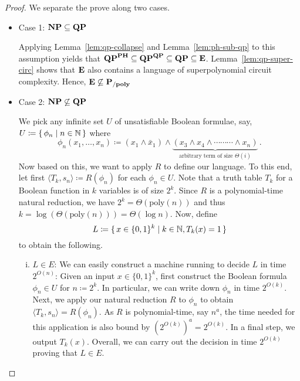 \documentclass[11pt]{article}
\begin{document}
\begin{proof}
  We separate the prove along two cases.
	\begin{itemize}
		\item Case 1: $\mathbf{NP} \subseteq \mathbf{QP}$

      Applying Lemma~\ref{lem:qp-collapse} and Lemma~\ref{lem:ph-sub-qp} to this assumption yields that
      $\mathbf{QP}^{\mathbf{PH}} \subseteq \mathbf{QP}^{\mathbf{QP}} \subseteq
       \mathbf{QP} \subseteq \mathbf{E}$.
      Lemma~\ref{lem:qp-super-circ} shows that $\mathbf{E}$ also contains
      a language of superpolynomial circuit complexity.
      Hence, $\mathbf{E} \not\subseteq \mathbf{P_{/poly}}$\\
		
		\item Case 2: $\mathbf{NP} \not\subseteq \mathbf{QP}$
		
      We pick any infinite set $U$ of unsatisfiable Boolean formulae, say,
      $U \coloneqq \{\, { \phi_n \mid n \in {\mathbb{N}} } \,\}$
      where
      \[
        \phi_n(x_1, \dots, x_n) \coloneqq
        (x_1 \land \bar x_1) \land
        \underbrace{(x_3 \land x_4 \land \cdots \cdots \cdots \land x_n)}_{
          \textrm{arbitrary term of size $\Theta(i)$}} \,.
      \]
      Now based on this, we want to apply $R$ to define our language. To this
      end, let first
      $\langle T_k, s_n \rangle \coloneqq R(\phi_n)$ for each $\phi_n \in U$.
      Note that a truth table $T_k$ for a Boolean function in $k$ variables is
      of size $2^k$. Since $R$ is a polynomial-time natural reduction, we have
      $2^k = \Theta(\textrm{poly}(n))$ and thus
      $k = \log(\Theta(\textrm{poly}(n))) = \Theta(\log n)$.
      Now, define
      \[
        L \coloneqq
        \{\, {
          x \in \{0,1\}^k \mid
          k \in {\mathbb{N}},
          T_k(x) = 1
        } \,\}
      \]
      to obtain the following.
      \begin{enumerate}[(i)]
        \item $L \in E$:
          We can easily construct a machine running to decide $L$ in time
          $2^{O(n)}$: Given an input $x \in \{0,1\}^k$, first construct the
          Boolean formula $\phi_n \in U$ for $n \coloneqq 2^k$.
          In particular, we can write down $\phi_n$ in time $2^{O(k)}$.
          Next, we apply our natural reduction $R$ to $\phi_n$ to obtain
          $\langle T_k, s_n \rangle = R(\phi_n)$.
          As $R$ is polynomial-time, say $n^a$, the time needed for this
          application is also bound by $(2^{O(k)})^a = 2^{O(k)}$.
          In a final step, we output $T_k(x)$.
          Overall, we can carry out the decision in time $2^{O(k)}$ proving
          that $L \in E$.


\end{enumerate}
\end{itemize}
\end{proof}
\end{document}
